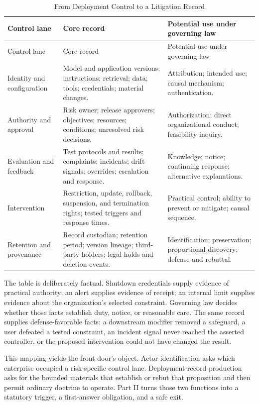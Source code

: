 \begin{longtable}{>{\raggedright\arraybackslash}p{} >{\raggedright\arraybackslash}p{} >{\raggedright\arraybackslash}p{}}
\caption{From Deployment Control to a Litigation Record}\label{tab:control-record}\\
\toprule
Control lane & Core record & Potential use under governing law \\
\midrule
\endfirsthead
\toprule
Control lane & Core record & Potential use under governing law \\
\midrule
\endhead
Identity and configuration & Model and application versions; instructions; retrieval; data; tools; credentials; material changes. & Attribution; intended use; causal mechanism; authentication. \\
Authority and approval & Risk owner; release approvers; objectives; resources; conditions; unresolved risk decisions. & Authorization; direct organizational conduct; feasibility inquiry. \\
Evaluation and feedback & Test protocols and results; complaints; incidents; drift signals; overrides; escalation and response. & Knowledge; notice; continuing response; alternative explanations. \\
Intervention & Restriction, update, rollback, suspension, and termination rights; tested triggers and response times. & Practical control; ability to prevent or mitigate; causal sequence. \\
Retention and provenance & Record custodian; retention period; version lineage; third-party holders; legal holds and deletion events. & Identification; preservation; proportional discovery; defense and rebuttal. \\
\bottomrule
\end{longtable}

The table is deliberately factual. Shutdown credentials supply evidence of practical authority; an alert supplies evidence of receipt; an internal limit supplies evidence about the organization's selected constraint. Governing law decides whether those facts establish duty, notice, or reasonable care. The same record supplies defense-favorable facts: a downstream modifier removed a safeguard, a user defeated a tested constraint, an incident signal never reached the asserted controller, or the proposed intervention could not have changed the result.

This mapping yields the front door's object. Actor-identification asks which enterprise occupied a risk-specific control lane. Deployment-record production asks for the bounded materials that establish or rebut that proposition and then permit ordinary doctrine to operate. Part II turns those two functions into a statutory trigger, a first-answer obligation, and a safe exit.
